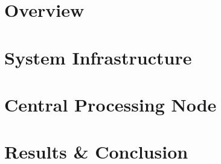 \part{Overview}
\newpage


\part{System Infrastructure}
\newpage

\newpage

\part{Central Processing Node}
\newpage

\newpage


\part{Results \& Conclusion}
\newpage

\newpage